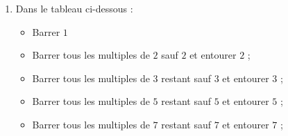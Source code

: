     \begin{enumerate}
        \item Dans le tableau ci-dessous :
        \begin{itemize}
            \item Barrer $1$
            \item Barrer tous les multiples de $2$ sauf $2$ et entourer $2$ ;
            \item Barrer tous les multiples de $3$ restant sauf $3$ et entourer $3$ ;
            \item Barrer tous les multiples de $5$ restant sauf $5$ et entourer $5$ ;
            \item Barrer tous les multiples de $7$ restant sauf $7$ et entourer $7$ ;
        \end{itemize}


\end{enumerate}
